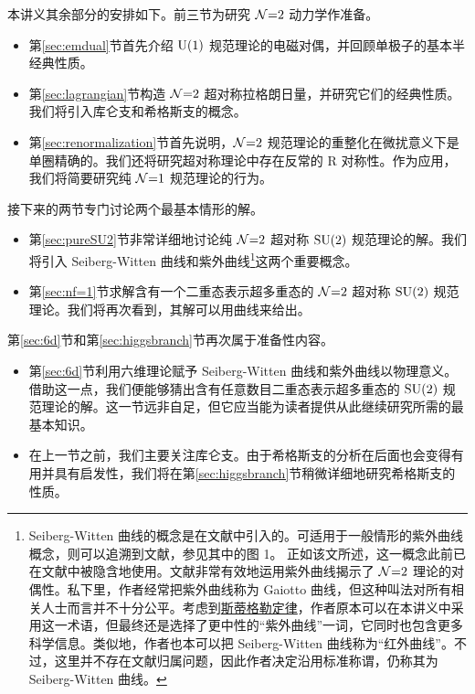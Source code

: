 本讲义其余部分的安排如下。前三节为研究 $\mathcal{N}{=}2$ 动力学作准备。
\begin{itemize}
\item 第\ref{sec:emdual}节首先介绍 ${\mathrm{U}}(1)$ 规范理论的电磁对偶，并回顾单极子的基本半经典性质。
\item 第\ref{sec:lagrangian}节构造 $\mathcal{N}{=}2$ 超对称拉格朗日量，并研究它们的经典性质。我们将引入库仑支和希格斯支的概念。
\item 第\ref{sec:renormalization}节首先说明，$\mathcal{N}{=}2$ 规范理论的重整化在微扰意义下是单圈精确的。我们还将研究超对称理论中存在反常的 R 对称性。作为应用，我们将简要研究纯 $\mathcal{N}{=}1$ 规范理论的行为。
\end{itemize}
\noindent 接下来的两节专门讨论两个最基本情形的解。
\begin{itemize}
\item 第\ref{sec:pureSU2}节非常详细地讨论纯 $\mathcal{N}{=}2$ 超对称 $\mathop{\mathrm{SU}}(2)$ 规范理论的解。我们将引入 Seiberg-Witten 曲线和紫外曲线\footnote{Seiberg-Witten 曲线的概念是在文献\cite{Seiberg:1994rs}中引入的。可适用于一般情形的紫外曲线概念，则可以追溯到文献\cite{Klemm:1996bj}，参见其中的图 1。 正如该文所述，这一概念此前已在文献\cite{Gorsky:1995zq,Martinec:1995by,Itoyama:1995nv}中被隐含地使用。文献\cite{Gaiotto:2009we}非常有效地运用紫外曲线揭示了 $\mathcal{N}{=}2$ 理论的对偶性。私下里，作者经常把紫外曲线称为 Gaiotto 曲线，但这种叫法对所有相关人士而言并不十分公平。考虑到\href{http://en.wikipedia.org/wiki/Stigler's_law_of_eponymy}{斯蒂格勒定律}，作者原本可以在本讲义中采用这一术语，但最终还是选择了更中性的“紫外曲线”一词，它同时也包含更多科学信息。类似地，作者也本可以把 Seiberg-Witten 曲线称为“红外曲线”。不过，这里并不存在文献归属问题，因此作者决定沿用标准称谓，仍称其为 Seiberg-Witten 曲线。}这两个重要概念。
\item 第\ref{sec:nf=1}节求解含有一个二重态表示超多重态的 $\mathcal{N}{=}2$ 超对称 $\mathop{\mathrm{SU}}(2)$ 规范理论。我们将再次看到，其解可以用曲线来给出。
\end{itemize}
\noindent 第\ref{sec:6d}节和第\ref{sec:higgsbranch}节再次属于准备性内容。
\begin{itemize}
\item 第\ref{sec:6d}节利用六维理论赋予 Seiberg-Witten 曲线和紫外曲线以物理意义。借助这一点，我们便能够猜出含有任意数目二重态表示超多重态的 $\mathop{\mathrm{SU}}(2)$ 规范理论的解。这一节远非自足，但它应当能为读者提供从此继续研究所需的最基本知识。
\item 在上一节之前，我们主要关注库仑支。由于希格斯支的分析在后面也会变得有用并具有启发性，我们将在第\ref{sec:higgsbranch}节稍微详细地研究希格斯支的性质。
\end{itemize}

